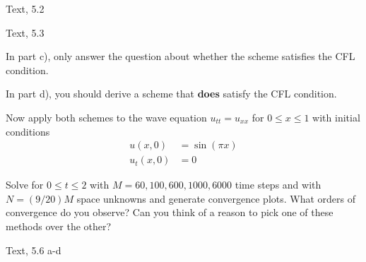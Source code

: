 \documentclass[minion]{homework}
\begin{document}
\begin{problems}

\problem  Text, 5.2

\problem  Text, 5.3 

In part c), only answer the question about whether the scheme satisfies the CFL condition.

In part d), you should derive a scheme that \textbf{does} satisfy the CFL condition.

 Now apply both schemes to the wave equation $u_{tt}=u_{xx}$ for $0\le x\le 1$
with initial conditions
\begin{equation}
\begin{aligned}
u(x,0) &= \sin(\pi x)\\
u_t(x,0) &= 0
\end{aligned}
\end{equation}

Solve for $0\le t\le 2$ with $M=60, 100, 600, 1000, 6000$ time steps and with $N=(9/20) M$ space unknowns and generate convergence plots.  What orders
of convergence do you observe?  Can you think of a reason to pick one of these
methods over the other?

\problem  Text, 5.6 a-d

\end{problems}
\end{document}
